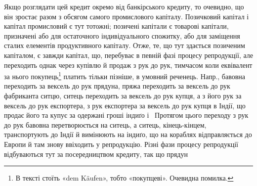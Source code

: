 Якщо розглядати цей кредит окремо від банкірського кредиту, то очевидно,
що він зростає разом з обсягом самого промислового капіталу. Позичковий капітал
і капітал промисловий є тут тотожні; позичені капітали є товарові капітали,
призначені або для остаточного індивідуального спожитку, або для заміщення
сталих елементів продуктивного капіталу. Отже, те, що тут здається
позиченим капіталом, є завжди капітал, що, перебуває в певній фазі процесу репродукції,
але переходить однак через купівлю й продаж з рук до рук, тимчасом
коли еквівалент за нього покупець\footnote*{
В тексті стоїть «dem Käufen», тобто «покупцеві». Очевидна помилка. 
} платить тільки пізніше, в умовний реченець.
Напр., бавовна переходить за вексель до рук прядуна, пряжа переходить за
вексель до рук фабриканта ситцю, ситець переходить за вексель до рук купця,
а з його рук за вексель до рук експортера, з рук експортера за вексель до рук
купця в Індії, що продає його та купує за одержані гроші індиґо і~ Протягом
цього переходу з рук до рук бавовна перетворюється на ситець, а ситець,
кінець-кінцем, транспортують до Індії й вимінюють на індиґо, що на кораблях
відправляється до Европи й там знову ввіходить у репродукцію. Різні фази процесу
репродукції відбуваються тут за посередництвом кредиту, так що прядун
\parbreak{}  %
